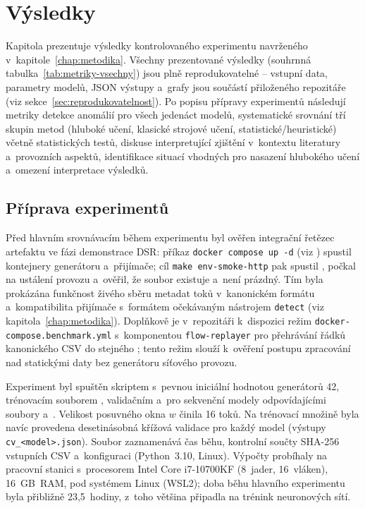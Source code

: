 \chapter{Výsledky}
\label{chap:vysledky}

Kapitola prezentuje výsledky kontrolovaného experimentu navrženého v~kapitole~\ref{chap:metodika}. Všechny prezentované výsledky (souhrnná tabulka~\ref{tab:metriky-vsechny}) jsou plně reprodukovatelné -- vstupní data, parametry modelů, JSON výstupy a~grafy jsou součástí přiloženého repozitáře (viz sekce~\ref{sec:reprodukovatelnost}). Po popisu přípravy experimentů následují metriky detekce anomálií pro všech jedenáct modelů, systematické srovnání tří skupin metod (hluboké učení, klasické strojové učení, statistické/heuristické) včetně statistických testů, diskuse interpretující zjištění v~kontextu literatury a~provozních aspektů, identifikace situací vhodných pro nasazení hlubokého učení a~omezení interpretace výsledků.

\section{Příprava experimentů}
\label{sec:priprava-exp}

Před hlavním srovnávacím během experimentu byl ověřen integrační řetězec artefaktu ve fázi demonstrace DSR: příkaz \texttt{docker compose up -d} (viz ) spustil kontejnery generátoru a~přijímače; cíl \texttt{make env-smoke-http} pak spustil , počkal na ustálení provozu a~ověřil, že soubor  existuje a~není prázdný.
Tím byla prokázána funkčnost živého sběru metadat toků v~kanonickém formátu a~kompatibilita přijímače s~formátem očekávaným nástrojem \texttt{detect} (viz kapitola~\ref{chap:metodika}).
Doplňkově je v~repozitáři k~dispozici režim \mbox{\texttt{docker-compose.benchmark.yml}} s~komponentou \texttt{flow-replayer} pro přehrávání řádků kanonického CSV do stejného ; tento režim slouží k~ověření postupu zpracování nad statickými daty bez generátoru síťového provozu.

Experiment byl spuštěn skriptem  s~pevnou  iniciální hodnotou generátorů 42, trénovacím souborem , validačním  a~pro sekvenční modely odpovídajícími soubory  a~.
Velikost posuvného okna $w$ činila 16 toků.
Na trénovací množině byla navíc provedena desetinásobná křížová validace pro každý model (výstupy \texttt{cv\_<model>.json}).
Soubor  zaznamenává čas běhu, kontrolní součty SHA-256 vstupních CSV a~konfiguraci (Python~3.10, Linux).
Výpočty probíhaly na pracovní stanici s~procesorem Intel Core i7-10700KF (8~jader, 16~vláken), 16~GB~RAM, pod systémem Linux (WSL2); doba běhu hlavního experimentu byla přibližně 23{,}5~hodiny, z~toho většina připadla na trénink neuronových sítí.

